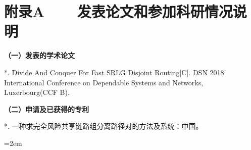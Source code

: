 
\chapter*{附录A~~~~发表论文和参加科研情况说明}
\setlength{\parindent}{0em}
\textbf{（一）发表的学术论文}
\begin{publist}
\item **. Divide And Conquer For Fast SRLG Disjoint Routing[C]. DSN 2018: International Conference on Dependable Systems and Networks, Luxerbourg(CCF B).
\end{publist}

\vspace*{1em}
\textbf{（二）申请及已获得的专利}
\begin{publist}
\item **. 一种求完全风险共享链路组分离路径对的方法及系统：中国。%
\end{publist}
\vfill
{}\hangindent=2em\noindent

\setlength{\parindent}{2em}
